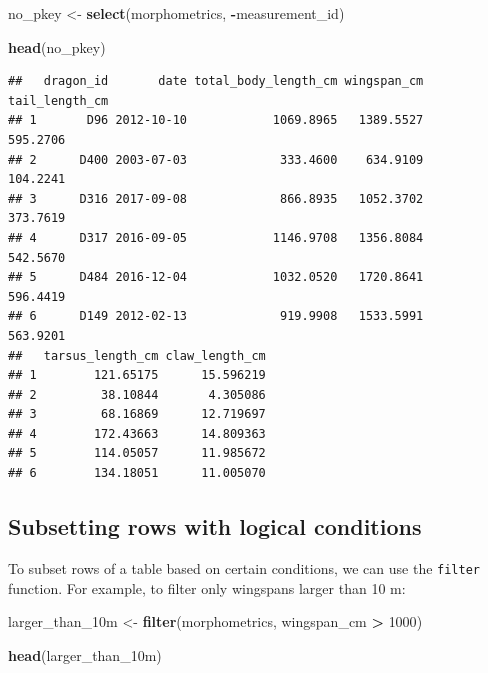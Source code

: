 \documentclass[
]{book}
\newenvironment{Shaded}{\begin{snugshade}}{\end{snugshade}}
\newcommand{\DecValTok}[1]{\textcolor[rgb]{0.00,0.00,0.81}{#1}}
\newcommand{\FunctionTok}[1]{\textcolor[rgb]{0.13,0.29,0.53}{\textbf{#1}}}
\newcommand{\NormalTok}[1]{#1}
\newcommand{\OtherTok}[1]{\textcolor[rgb]{0.56,0.35,0.01}{#1}}
\newcommand{\SpecialCharTok}[1]{\textcolor[rgb]{0.81,0.36,0.00}{\textbf{#1}}}
\begin{document}
\begin{Shaded}
\begin{Highlighting}[]
\NormalTok{no\_pkey }\OtherTok{\textless{}{-}} \FunctionTok{select}\NormalTok{(morphometrics, }\SpecialCharTok{{-}}\NormalTok{measurement\_id)}

\FunctionTok{head}\NormalTok{(no\_pkey)}
\end{Highlighting}
\end{Shaded}

\begin{verbatim}
##   dragon_id       date total_body_length_cm wingspan_cm tail_length_cm
## 1       D96 2012-10-10            1069.8965   1389.5527       595.2706
## 2      D400 2003-07-03             333.4600    634.9109       104.2241
## 3      D316 2017-09-08             866.8935   1052.3702       373.7619
## 4      D317 2016-09-05            1146.9708   1356.8084       542.5670
## 5      D484 2016-12-04            1032.0520   1720.8641       596.4419
## 6      D149 2012-02-13             919.9908   1533.5991       563.9201
##   tarsus_length_cm claw_length_cm
## 1        121.65175      15.596219
## 2         38.10844       4.305086
## 3         68.16869      12.719697
## 4        172.43663      14.809363
## 5        114.05057      11.985672
## 6        134.18051      11.005070
\end{verbatim}

\hypertarget{subsetting-rows-with-logical-conditions}{%
\subsection{Subsetting rows with logical conditions}\label{subsetting-rows-with-logical-conditions}}

To subset rows of a table based on certain conditions, we can use the \texttt{filter}
function. For example, to filter only wingspans larger than 10 m:

\begin{Shaded}
\begin{Highlighting}[]
\NormalTok{larger\_than\_10m }\OtherTok{\textless{}{-}} \FunctionTok{filter}\NormalTok{(morphometrics, wingspan\_cm }\SpecialCharTok{\textgreater{}} \DecValTok{1000}\NormalTok{)}

\FunctionTok{head}\NormalTok{(larger\_than\_10m)}
\end{Highlighting}
\end{Shaded}
\end{document}
